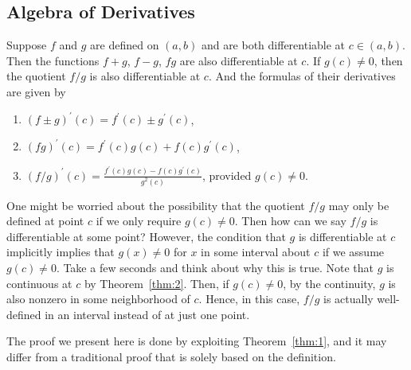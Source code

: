 \documentclass[thmcnt=section, 12pt]{my-elegantbook}
\begin{document}

\subsection{Algebra of Derivatives}


\begin{theorem}
    Suppose $f$ and $g$ are defined on $(a, b)$ and are both differentiable at $c \in (a, b)$. Then the functions $f + g$, $f - g$, $fg$ are also differentiable at $c$. If $g(c) \neq 0$, then the quotient $f / g$ is also differentiable at $c$. And the formulas of their derivatives are given by 
    \begin{enumerate}
        \item $(f \pm g)^\prime(c) = f^\prime(c) \pm g^\prime(c)$, 
        \item $(f g)^\prime(c) = f^\prime(c) g(c) + f(c) g^\prime(c)$, 
        \item $(f / g)^\prime(c) = \frac{f^\prime(c) g(c) - f(c) g^\prime(c)}{ g^2(c) }$, provided $g(c) \neq 0$.
    \end{enumerate}
\end{theorem}

\begin{remark}
    One might be worried about the possibility that the quotient $f / g$ may only be defined at point $c$ if we only require $g(c) \neq 0$. Then how can we say $f / g$ is differentiable at some point? However, the condition that $g$ is differentiable at $c$ implicitly implies that $g(x) \neq 0$ for $x$ in some interval about $c$ if we assume $g(c) \neq 0$. Take a few seconds and think about why this is true. Note that $g$ is continuous at $c$ by Theorem~\ref{thm:2}. Then, if $g(c) \neq 0$, by the continuity, $g$ is also nonzero in some neighborhood of $c$. Hence, in this case, $f / g$ is actually well-defined in an interval instead of at just one point.
\end{remark}

The proof we present here is done by exploiting Theorem~\ref{thm:1}, and it may differ from a traditional proof that is solely based on the definition.
\end{document}
